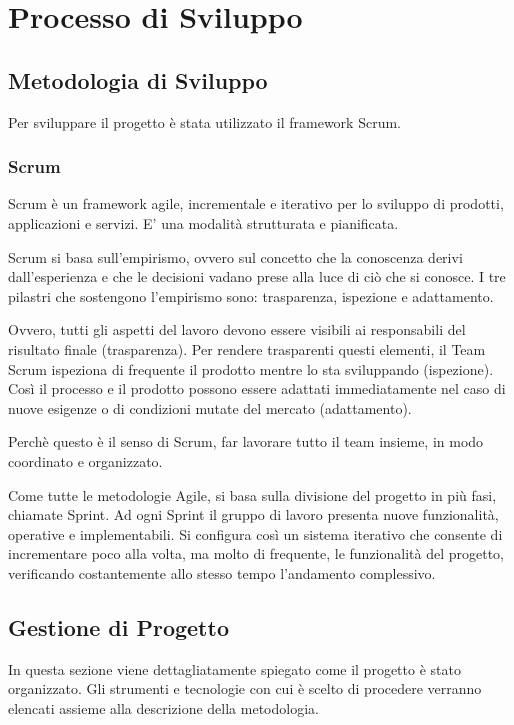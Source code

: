 \chapter{Processo di Sviluppo}


\section{Metodologia di Sviluppo}
Per sviluppare il progetto è stata utilizzato il framework Scrum. 
    \subsection{Scrum}
    Scrum è un framework agile, incrementale e iterativo per lo sviluppo di prodotti, applicazioni e servizi. E' una modalità strutturata e pianificata.
    
    Scrum si basa sull’empirismo, ovvero sul concetto che la conoscenza derivi dall’esperienza e che le decisioni vadano prese alla luce di ciò che si conosce. I tre pilastri che sostengono l’empirismo sono: trasparenza, ispezione e adattamento.
    
    Ovvero, tutti gli aspetti del lavoro devono essere visibili ai responsabili del risultato finale (trasparenza). Per rendere trasparenti questi elementi, il Team Scrum ispeziona di frequente il prodotto mentre lo sta sviluppando (ispezione). Così il processo e il prodotto possono essere adattati immediatamente nel caso di nuove esigenze o di condizioni mutate del mercato (adattamento). 
    
    Perchè questo è il senso di Scrum, far lavorare tutto il team insieme, in modo coordinato e organizzato.
    
    Come tutte le metodologie Agile, si basa sulla divisione del progetto in più fasi, chiamate Sprint.
Ad ogni Sprint il gruppo di lavoro presenta nuove funzionalità, operative e implementabili. Si configura così un sistema iterativo che consente di incrementare poco alla volta, ma molto di frequente, le funzionalità del progetto, verificando costantemente allo stesso tempo l'andamento complessivo.
    

\section{Gestione di Progetto}
In questa sezione viene dettagliatamente spiegato come il progetto è stato organizzato. Gli strumenti e tecnologie con cui è scelto di procedere verranno elencati assieme alla descrizione della metodologia.
